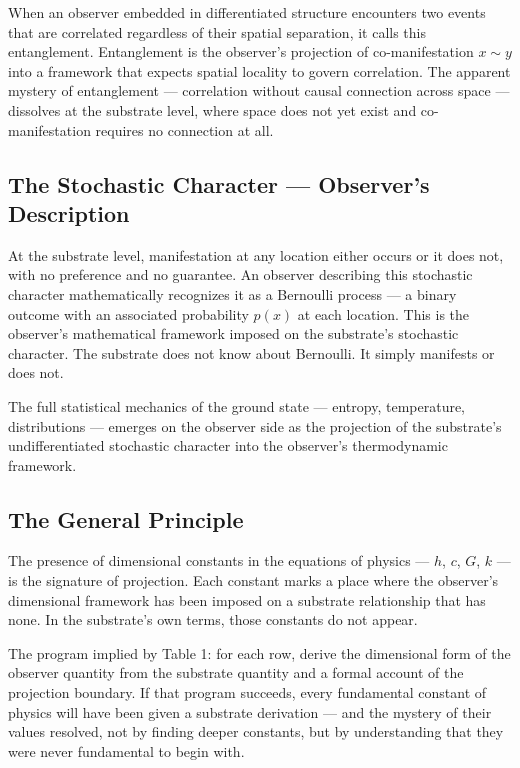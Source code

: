 \documentclass[11pt,letterpaper]{article}
\begin{document}
When an observer embedded in differentiated structure encounters two events that are correlated regardless of their spatial separation, it calls this entanglement. Entanglement is the observer's projection of co-manifestation \(x \sim y\) into a framework that expects spatial locality to govern correlation. The apparent mystery of entanglement --- correlation without causal connection across space --- dissolves at the substrate level, where space does not yet exist and co-manifestation requires no connection at all.
\subsection{The Stochastic Character --- Observer's Description}
\label{sec:orgd32f08d}

At the substrate level, manifestation at any location either occurs or it does not, with no preference and no guarantee. An observer describing this stochastic character mathematically recognizes it as a Bernoulli process --- a binary outcome with an associated probability \(p(x)\) at each location. This is the observer's mathematical framework imposed on the substrate's stochastic character. The substrate does not know about Bernoulli. It simply manifests or does not.

The full statistical mechanics of the ground state --- entropy, temperature, distributions --- emerges on the observer side as the projection of the substrate's undifferentiated stochastic character into the observer's thermodynamic framework.
\subsection{The General Principle}
\label{sec:org734d1e4}

The presence of dimensional constants in the equations of physics --- \(h\), \(c\), \(G\), \(k\) --- is the signature of projection. Each constant marks a place where the observer's dimensional framework has been imposed on a substrate relationship that has none. In the substrate's own terms, those constants do not appear.

The program implied by Table 1: for each row, derive the dimensional form of the observer quantity from the substrate quantity and a formal account of the projection boundary. If that program succeeds, every fundamental constant of physics will have been given a substrate derivation --- and the mystery of their values resolved, not by finding deeper constants, but by understanding that they were never fundamental to begin with.
\end{document}
